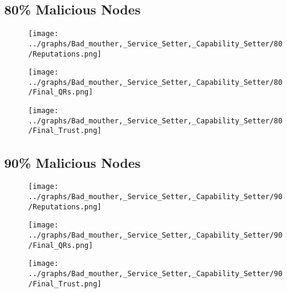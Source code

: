 \documentclass{article}
\begin{document}
  \begin{minipage}[t]{0.49\columnwidth}
    \subsection*{80\% Malicious Nodes}
        \begin{figure}[H]
            \centering
            \texttt{[image: ../graphs/Bad\_mouther,\_Service\_Setter,\_Capability\_Setter/80/Reputations.png]}
        \end{figure}
        \begin{figure}[H]
            \centering
            \texttt{[image: ../graphs/Bad\_mouther,\_Service\_Setter,\_Capability\_Setter/80/Final\_QRs.png]}
        \end{figure}
    \end{minipage}
    \begin{minipage}[t]{0.49\columnwidth}
        \begin{figure}[H]
            \centering
            \texttt{[image: ../graphs/Bad\_mouther,\_Service\_Setter,\_Capability\_Setter/80/Final\_Trust.png]}
        \end{figure}
    \end{minipage}

    \begin{minipage}[t]{0.49\columnwidth}
    \subsection*{90\% Malicious Nodes}
        \begin{figure}[H]
            \centering
            \texttt{[image: ../graphs/Bad\_mouther,\_Service\_Setter,\_Capability\_Setter/90/Reputations.png]}
        \end{figure}
        \begin{figure}[H]
            \centering
            \texttt{[image: ../graphs/Bad\_mouther,\_Service\_Setter,\_Capability\_Setter/90/Final\_QRs.png]}
        \end{figure}
    \end{minipage}
    \begin{minipage}[t]{0.49\columnwidth}
        \begin{figure}[H]
            \centering
            \texttt{[image: ../graphs/Bad\_mouther,\_Service\_Setter,\_Capability\_Setter/90/Final\_Trust.png]}
        \end{figure}
    \end{minipage}
    \newpage
\end{document}
